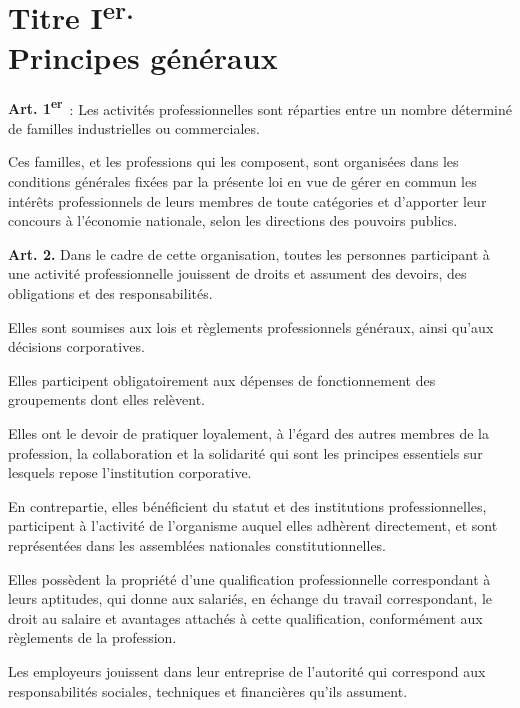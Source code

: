 \documentclass[french,twoside]{book} %
\newcommand{\labelchar}[1]{\textbf{\color{rubric} #1}}
\begin{document}
\section[{Titre Ier. Principes généraux}]{Titre I\textsuperscript{er.} \\
Principes généraux}
\renewcommand{\leftmark}{Titre I\textsuperscript{er.} \\
Principes généraux}

\noindent \labelchar{Art. 1\textsuperscript{er}} : Les activités professionnelles sont réparties entre un nombre déterminé de familles industrielles ou commerciales.\par
Ces familles, et les professions qui les composent, sont organisées dans les conditions générales fixées par la présente loi en vue de gérer en commun les intérêts professionnels de leurs membres de toute catégories et d’apporter leur concours à l’économie nationale, selon les directions des pouvoirs publics.\par
\bigbreak
\noindent \labelchar{Art. 2.} Dans le cadre de cette organisation, toutes les personnes participant à une activité professionnelle jouissent de droits et assument des devoirs, des obligations et des responsabilités.\par
Elles sont soumises aux lois et règlements professionnels généraux, ainsi qu’aux décisions corporatives.\par
Elles participent obligatoirement aux dépenses de fonctionnement des groupements dont elles relèvent.\par
Elles ont le devoir de pratiquer loyalement, à l’égard des autres membres de la profession, la collaboration et la solidarité qui sont les principes essentiels sur lesquels repose l’institution corporative.\par
En contrepartie, elles bénéficient du statut et des institutions professionnelles, participent à l’activité de l’organisme auquel elles adhèrent directement, et sont représentées dans les assemblées nationales constitutionnelles.\par
Elles possèdent la propriété d’une qualification professionnelle correspondant à leurs aptitudes, qui donne aux salariés, en échange du travail correspondant, le droit au salaire et avantages attachés à cette qualification, conformément aux règlements de la profession.\par
Les employeurs jouissent dans leur entreprise de l’autorité qui correspond aux responsabilités sociales, techniques et financières qu’ils assument.\par
\end{document}
